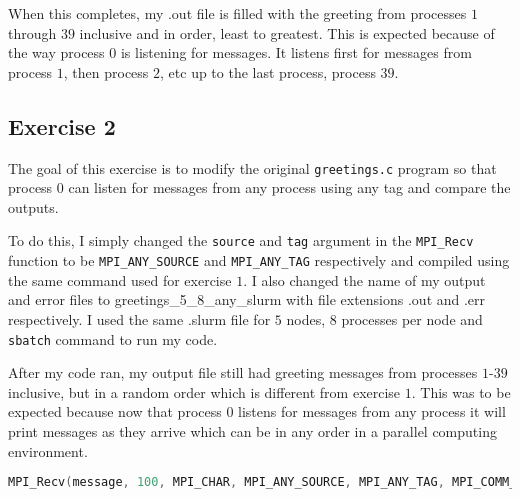 \documentclass[11pt]{article}
\begin{document}
	When this completes, my .out file is filled with the greeting from processes $1$ through $39$ inclusive and in order, least to greatest. This is expected because of the way process $0$ is listening for messages. It listens first for messages from process $1$, then process $2$, etc up to the last process, process $39$.
	\pagebreak

	
	
	
	
	

	
	
	\pagebreak
	\subsection{Exercise 2}
	The goal of this exercise is to modify the original \texttt{greetings.c} program so that process 0 can listen for messages from any process using any tag and compare the outputs.
	
	To do this, I simply changed the \texttt{source} and \texttt{tag} argument in the \texttt{MPI\_Recv} function to be \texttt{MPI\_ANY\_SOURCE} and \texttt{MPI\_ANY\_TAG} respectively and compiled using the same command used for exercise $1$. I also changed the name of my output and error files to greetings\_5\_8\_any\_slurm with file extensions .out and .err respectively. I used the same .slurm file for $5$ nodes, $8$ processes per node and \texttt{sbatch} command to run my code.
	
	After my code ran, my output file still had greeting messages from processes $1$-$39$ inclusive, but in a random order which is different from exercise $1$. This was to be expected because now that process $0$ listens for messages from any process it will print messages as they arrive which can be in any order in a parallel computing environment.
	
	\begin{lstlisting}[language=C, style=customc, caption=\texttt{MPI\_Recv} call is the only difference in code from exercise 1 to exercise 2:]
	MPI_Recv(message, 100, MPI_CHAR, MPI_ANY_SOURCE, MPI_ANY_TAG, MPI_COMM_WORLD, &status);
	\end{lstlisting}
	
\end{document}
